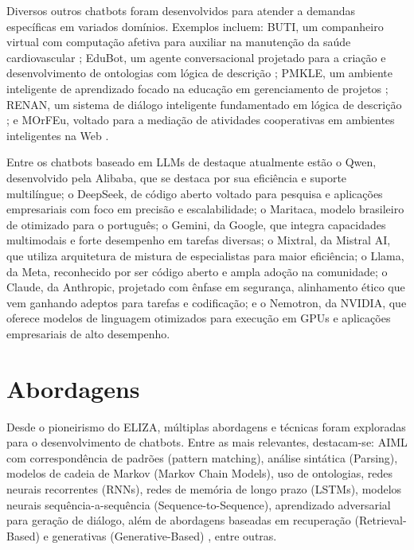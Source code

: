 \documentclass[14pt,a4paper,oneside]{book}
\begin{document}
Diversos outros chatbots foram desenvolvidos para atender a demandas específicas em variados domínios. Exemplos incluem: BUTI, um companheiro virtual com computação afetiva para auxiliar na manutenção da saúde cardiovascular \cite{Junior2008}; EduBot, um agente conversacional projetado para a criação e desenvolvimento de ontologias com lógica de descrição \cite{Lima2017}; PMKLE, um ambiente inteligente de aprendizado focado na educação em gerenciamento de projetos \cite{Torreao2005}; RENAN, um sistema de diálogo inteligente fundamentado em lógica de descrição \cite{AZEVEDO2015}; e MOrFEu, voltado para a mediação de atividades cooperativas em ambientes inteligentes na Web \cite{Bada2012}.

Entre os chatbots baseado em LLMs de destaque atualmente estão o Qwen, desenvolvido pela Alibaba, que se destaca por sua eficiência e suporte multilíngue; o DeepSeek, de código aberto voltado para pesquisa e aplicações empresariais com foco em precisão e escalabilidade; o Maritaca, modelo brasileiro de otimizado para o português; o Gemini, da Google, que integra capacidades multimodais e forte desempenho em tarefas diversas; o Mixtral, da Mistral AI, que utiliza arquitetura de mistura de especialistas para maior eficiência; o Llama, da Meta, reconhecido por ser código aberto e ampla adoção na comunidade; o Claude, da Anthropic, projetado com ênfase em segurança, alinhamento ético que vem ganhando adeptos para tarefas e codificação; e o Nemotron, da NVIDIA, que oferece modelos de linguagem otimizados para execução em GPUs e aplicações empresariais de alto desempenho. 

\section{Abordagens}

Desde o pioneirismo do ELIZA, múltiplas abordagens e técnicas foram exploradas para o desenvolvimento de chatbots. 
Entre as mais relevantes, destacam-se: AIML com correspondência de padrões (pattern matching), análise sintática (Parsing), modelos de cadeia de Markov (Markov Chain Models), uso de ontologias, redes neurais recorrentes (RNNs), redes de memória de longo prazo (LSTMs), modelos neurais sequência-a-sequência (Sequence-to-Sequence), aprendizado adversarial para geração de diálogo, além de abordagens baseadas em recuperação (Retrieval-Based) e generativas (Generative-Based) \cite{Borah2019, Ramesh2019, Shaikh2016, Abdul-Kader2015, Li2018}, entre outras.
\end{document}
